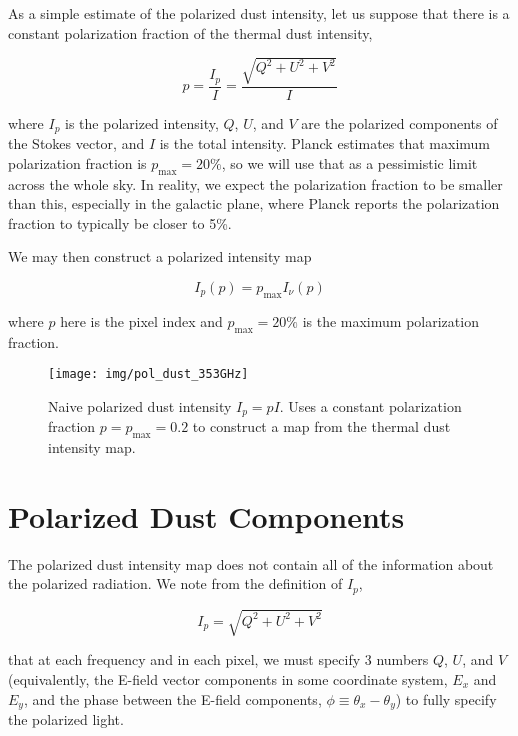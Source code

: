 \documentclass[twoside,10pt]{article}
\begin{document}
As a simple estimate of the polarized dust intensity, let us suppose that
there is a constant polarization fraction of the thermal dust intensity,

\begin{equation}
    p = \frac{I_p}{I} = \frac{\sqrt{Q^2 + U^2 + V^2}}{I}
\end{equation}

where $I_p$ is the polarized intensity, $Q$, $U$, and $V$ are the polarized
components of the Stokes vector, and $I$ is the total intensity. Planck
estimates that maximum polarization fraction is
$p_\mathrm{max} = 20\%$\cite{planck_collaboration_planck_2014-1}, so we will
use that as a pessimistic limit across the whole sky. In reality, we expect
the polarization fraction to be smaller than this, especially in the galactic
plane, where Planck reports the polarization fraction to typically be closer
to 5\%.

We may then construct a polarized intensity map

\begin{equation}
    I_p(p) = p_\mathrm{max} I_\nu(p)
\end{equation}

where $p$ here is the pixel index and $p_\mathrm{max} = 20\%$ is the maximum
polarization fraction.

\begin{figure}[th]
    \begin{center}
        \texttt{[image: img/pol\_dust\_353GHz]}
    \end{center}
    \caption{Naive polarized dust intensity $I_p = pI$. Uses a constant
    polarization fraction $p = p_\mathrm{max} = 0.2$ to construct a map from
    the thermal dust intensity map.}
    \label{fig:pol_dust_353}
\end{figure}


\section{Polarized Dust Components}
\label{sec:polarized_dust_components}

The polarized dust intensity map does not contain all of the information
about the polarized radiation. We note from the definition of $I_p$,

\begin{equation}
    I_p = \sqrt{Q^2 + U^2 + V^2}
\end{equation}

that at each frequency and in each pixel, we must specify 3 numbers $Q$, $U$,
and $V$ (equivalently, the E-field vector components in some coordinate
system, $E_x$ and $E_y$, and the phase between the E-field components,
$\phi \equiv \theta_x - \theta_y$)\cite{kamionkowski_statistics_1997}
to fully specify the polarized light.
\end{document}
